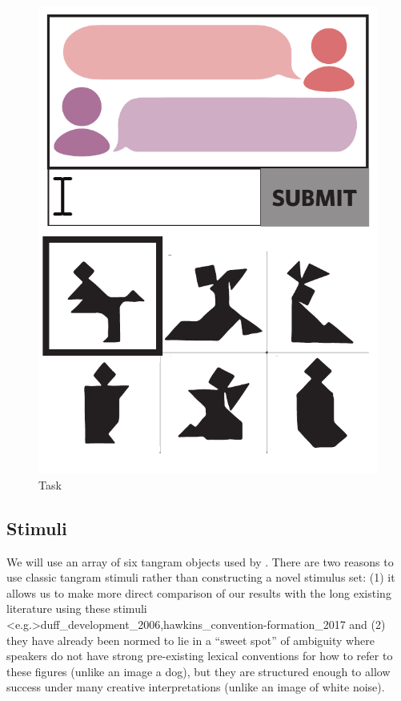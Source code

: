 \documentclass[11pt, floatsintext]{apa6}
\begin{document}
\begin{figure}
\centering
    \includegraphics[scale=.27]{task1_display.pdf}
  \caption{Task}%
  \label{fig:task1_display}
\end{figure}

\subsection{Stimuli}
We will use an array of six tangram objects used by . There are two reasons to use classic tangram stimuli rather than constructing a novel stimulus set: (1) it allows us to make more direct comparison of our results with the long existing literature using these stimuli  \shortcite<e.g.>{duff_development_2006,hawkins_convention-formation_2017} and (2) they have already been normed to lie in a ``sweet spot'' of ambiguity where speakers do not have strong pre-existing lexical conventions for how to refer to these figures (unlike an image a dog), but they are structured enough to allow success under many creative interpretations (unlike an image of white noise).
\end{document}
